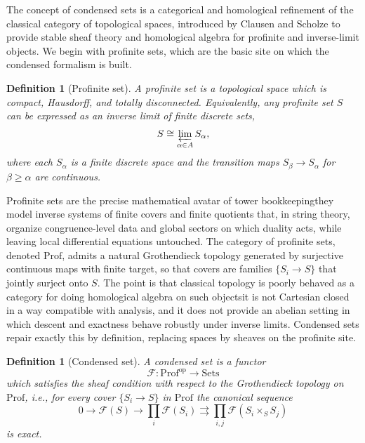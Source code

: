 \documentclass[11pt]{article}
\newtheorem{definition}[theorem]{Definition}
\theoremstyle{remark}
\newcommand{\calF}{\mathcal{F}}
\begin{document}
The concept of condensed sets is a categorical and homological refinement of the classical category of topological spaces, introduced by Clausen and Scholze \cite{ClausenScholze} to provide stable sheaf theory and homological algebra for profinite and inverse-limit objects. We begin with profinite sets, which are the basic site on which the condensed formalism is built. \begin{definition}[Profinite set]A profinite set is a topological space which is compact, Hausdorff, and totally disconnected. Equivalently, any profinite set \(S\) can be expressed as an inverse limit of finite discrete sets,
\begin{equation}\label{1}
S \cong \varprojlim_{\alpha\in A} S_{\alpha},
\end{equation}
where each \(S_{\alpha}\) is a finite discrete space and the transition maps \(S_{\beta}\to S_{\alpha}\) for \(\beta\ge \alpha\) are continuous.\end{definition}
 Profinite sets are the precise mathematical avatar of tower bookkeeping\:they model inverse systems of finite covers and finite quotients that, in string theory, organize congruence-level data and global sectors on which duality acts, while leaving local differential equations untouched. The category of profinite sets, denoted \(\mathrm{Prof}\), admits a natural Grothendieck topology generated by surjective continuous maps with finite target, so that covers are families \(\{S_i\to S\}\) that jointly surject onto \(S\). The point is that classical topology is poorly behaved as a category for doing homological algebra on such objects\:it is not Cartesian closed in a way compatible with analysis, and it does not provide an abelian setting in which descent and exactness behave robustly under inverse limits. Condensed sets repair exactly this by definition, replacing spaces by sheaves on the profinite site. \begin{definition}[Condensed set]\label{def:condensed}A condensed set is a functor
\begin{equation}\label{2}
\calF:\mathrm{Prof}^{\mathrm{op}}\to \mathrm{Sets}
\end{equation}
which satisfies the sheaf condition with respect to the Grothendieck topology on \(\mathrm{Prof}\), i.e., for every cover \(\{S_i\to S\}\) in \(\mathrm{Prof}\) the canonical sequence
\begin{equation}\label{3}
0\to \calF(S)\to \prod_i \calF(S_i)\rightrightarrows \prod_{i,j}\calF(S_i\times_S S_j)
\end{equation}
is exact.\end{definition}
\end{document}
